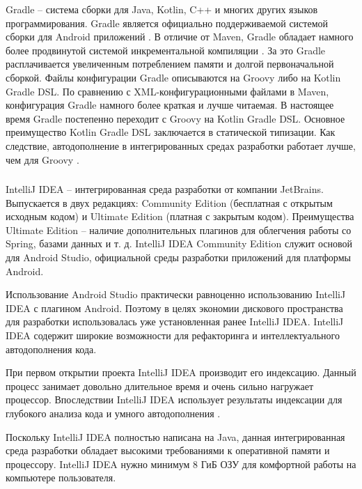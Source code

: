 Gradle -- система сборки для Java, Kotlin, C++ и многих других языков программирования.
Gradle является официально поддерживаемой системой сборки для Android приложений \cite{android_build}.
В отличие от Maven, Gradle обладает намного более продвинутой системой инкрементальной компиляции \cite{gradle_vs_maven}.
За это Gradle расплачивается увеличенным потреблением памяти и долгой первоначальной сборкой.
Файлы конфигурации Gradle описываются на Groovy либо на Kotlin Gradle DSL.
По сравнению с XML-конфигурационными файлами в Maven, конфигурация Gradle намного более краткая и лучше читаемая.
В настоящее время Gradle постепенно переходит с Groovy на Kotlin Gradle DSL.
Основное преимущество Kotlin Gradle DSL заключается в статической типизации.
Как следствие, автодополнение в интегрированных средах разработки работает лучше, чем для Groovy \cite{kotlin_gradle_dsl_pros}.

\subsubsection{}
\label{subsub:theory_and_motivation:tools:intellij_idea}

IntelliJ IDEA -- интегрированная среда разработки от компании JetBrains.
Выпускается в двух редакциях: Community Edition (бесплатная с открытым исходным кодом) и Ultimate Edition (платная с закрытым кодом).
Преимущества Ultimate Edition -- наличие дополнительных плагинов для облегчения работы со Spring, базами данных и т. д.
IntelliJ IDEA Community Edition служит основой для Android Studio, официальной среды разработки приложений для платформы Android.

Использование Android Studio практически равноценно использованию IntelliJ IDEA с плагином Android.
Поэтому в целях экономии дискового пространства для разработки использовалась уже установленная ранее IntelliJ IDEA.
IntelliJ IDEA содержит широкие возможности для рефакторинга и интеллектуального автодополнения кода.

При первом открытии проекта IntelliJ IDEA производит его индексацию.
Данный процесс занимает довольно длительное время и очень сильно нагружает процессор.
Впоследствии IntelliJ IDEA использует результаты индексации для глубокого анализа кода и умного автодополнения \cite{intellij_idea_features}.

Поскольку IntelliJ IDEA полностью написана на Java, данная интегрированная среда разработки обладает высокими требованиями к оперативной памяти и процессору.
IntelliJ IDEA нужно минимум 8 ГиБ ОЗУ для комфортной работы на компьютере пользователя.
